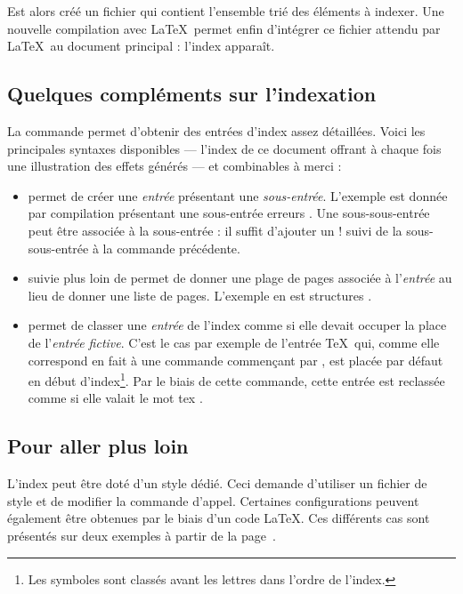 Est alors créé un fichier  qui contient l'ensemble trié des éléments à indexer. Une nouvelle compilation avec \LaTeX\ permet enfin d'intégrer ce fichier attendu par \LaTeX\ au document principal : l'index apparaît.


\subsection{Quelques compléments sur l'indexation}

La commande  permet d'obtenir des entrées d'index assez détaillées. Voici les principales syntaxes disponibles --- l'index de ce document offrant à chaque fois une illustration des effets générés --- et combinables à merci :

\begin{itemize}
\item {} permet de créer une \textit{entrée} présentant une \textit{sous-entrée}. L'exem\-ple est donnée par \og compilation \fg présentant une sous-entrée \og erreurs \fg. Une sous-sous-entrée peut être associée à la sous-entrée : il suffit d'ajouter un \og ! \fg suivi de la sous-sous-entrée à la commande précédente. 
\item {} suivie plus loin de  permet de donner une plage de pages associée à l'\textit{entrée} au lieu de donner une liste de pages. L'exemple en est \og structures \fg.
\item {} permet de classer une \textit{entrée} de l'index comme si elle devait occuper la place de l'\textit{entrée fictive}. C'est le cas par exemple de l'entrée \TeX\ qui, comme elle correspond en fait à une  commande commençant par \macro{}, est placée par défaut en début d'index\footnote{Les symboles sont classés avant les lettres dans l'ordre de l'index.}. Par le biais de cette  commande, cette entrée est reclassée comme si elle valait le mot \og tex \fg.   
\end{itemize}

\subsection{Pour aller plus loin} \label{styleindex}

L'index peut être doté d'un style dédié. Ceci demande d'utiliser un fichier de style  et de modifier la commande d'appel. Certaines configurations peuvent également être obtenues par le biais d'un code \LaTeX{}. Ces différents cas sont présentés sur deux exemples à partir de la page~\pageref{persoindex}.

